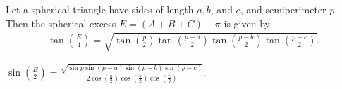 \begin{tcolorbox}[title={The Global Half--Side Identities}]
\begin{tcolorbox}[title={L'Huilier's \& Cagnoli's Halveside Theorems}]
    \begin{question}[name={L'Huilier's Theorem}]
        Let a spherical triangle have sides of length $a, b$, and $c$, and semiperimeter $p$. Then the spherical excess $E=(A+B+C)-\pi$ is given by
        \begin{align*}
            \tan\left(\frac{E}{4}\right)=\sqrt{\tan\left(\frac{p}{2}\right)\tan\left(\frac{p-a}{2}\right)\tan\left(\frac{p-b}{2}\right)\tan\left(\frac{p-c}{2}\right)}. 
        \end{align*}
    \end{question}
    \begin{question}[name={Cagnoli's Theorem}]
        $\displaystyle \sin\left(\frac{E}{2}\right)=\frac{\sqrt{\sin p \sin(p-a)\sin(p-b)\sin(p-c)}}{\displaystyle 2\cos\left(\frac{a}{2}\right)\cos\left(\frac{b}{2}\right)\cos\left(\frac{c}{2}\right)}$.
    \end{question}
\end{tcolorbox}
\end{tcolorbox}



